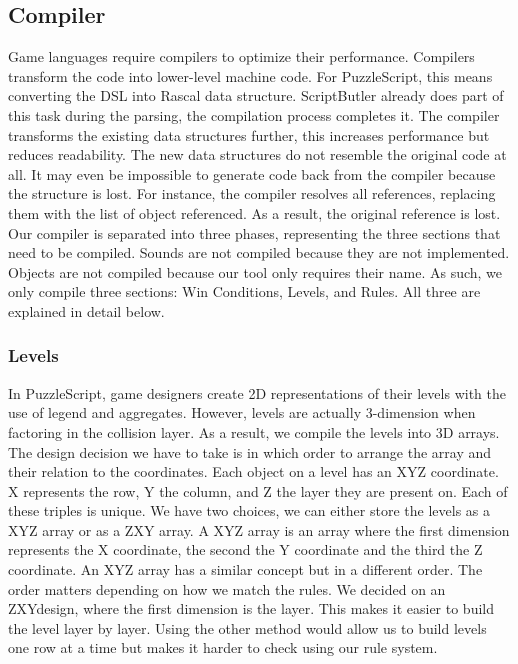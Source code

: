 \subsection{Compiler}
Game languages require compilers to optimize their performance. Compilers transform the code into lower-level machine code. For PuzzleScript, this means converting the DSL into Rascal data structure. ScriptButler already does part of this task during the parsing, the compilation process completes it. The compiler transforms the existing data structures further, this increases performance but reduces readability. The new data structures do not resemble the original code at all. It may even be impossible to generate code back from the compiler because the structure is lost. For instance, the compiler resolves all references, replacing them with the list of object referenced. As a result, the original reference is lost. Our compiler is separated into three phases, representing the three sections that need to be compiled. Sounds are not compiled because they are not implemented. Objects are not compiled because our tool only requires their name. As such, we only compile three sections: Win Conditions, Levels, and Rules. All three are explained in detail below.

\subsubsection{Levels}
In PuzzleScript, game designers create 2D representations of their levels with the use of legend and aggregates. However, levels are actually 3-dimension when factoring in the collision layer. As a result, we compile the levels into 3D arrays. The design decision we have to take is in which order to arrange the array and their relation to the coordinates. Each object on a level has an XYZ coordinate. X represents the row, Y the column, and Z the layer they are present on. Each of these triples is unique. We have two choices, we can either store the levels as a XYZ array or as a ZXY array. A XYZ array is an array where the first dimension represents the X coordinate, the second the Y coordinate and the third the Z coordinate. An XYZ array has a similar concept but in a different order. The order matters depending on how we match the rules. We decided on an ZXY\dd design, where the first dimension is the layer. This makes it easier to build the level layer by layer. Using the other method would allow us to build levels one row at a time but makes it harder to check using our rule system.


